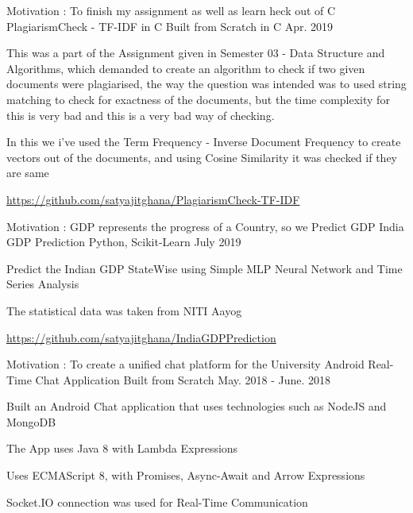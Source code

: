 \begin{cventries}
    \cventry
        {Motivation : To finish my assignment as well as learn heck out of C}
        {PlagiarismCheck - TF-IDF in C}
        {Built from Scratch in C}
        {Apr. 2019}
        {
            \begin{cvitems}
               \item {This was a part of the Assignment given in Semester 03 - Data Structure and Algorithms, which demanded to create an algorithm to check if two given documents were plagiarised, the way the question was intended was to used string matching to check for exactness of the documents, but the time complexity for this is very bad and this is a very bad way of checking.}
               \item {In this we i've used the Term Frequency - Inverse Document Frequency to create vectors out of the documents, and using Cosine Similarity it was checked if they are same} 
               \item {\url{https://github.com/satyajitghana/PlagiarismCheck-TF-IDF}}
            \end{cvitems}
        }
    \cventry
        {Motivation : GDP represents the progress of a Country, so we Predict GDP}
        {India GDP Prediction}
        {Python, Scikit-Learn}
        {July 2019}
        {
            \begin{cvitems}
               \item {Predict the Indian GDP StateWise using Simple MLP Neural Network and Time Series Analysis}
               \item {The statistical data was taken from NITI Aayog}
               \item {\url{https://github.com/satyajitghana/IndiaGDPPrediction}}
            \end{cvitems}
        }
    \cventry
        {Motivation : To create a unified chat platform for the University}
        {Android Real-Time Chat Application}
        {Built from Scratch}
        {May. 2018 - June. 2018}
        {
            \begin{cvitems}
                \item {Built an Android Chat application that uses technologies such as NodeJS and MongoDB}
                \item {The App uses Java 8 with Lambda Expressions}
                \item {Uses ECMAScript 8, with Promises, Async-Await and Arrow Expressions}
                \item {Socket.IO connection was used for Real-Time Communication}

\end{cvitems}}
\end{cventries}
